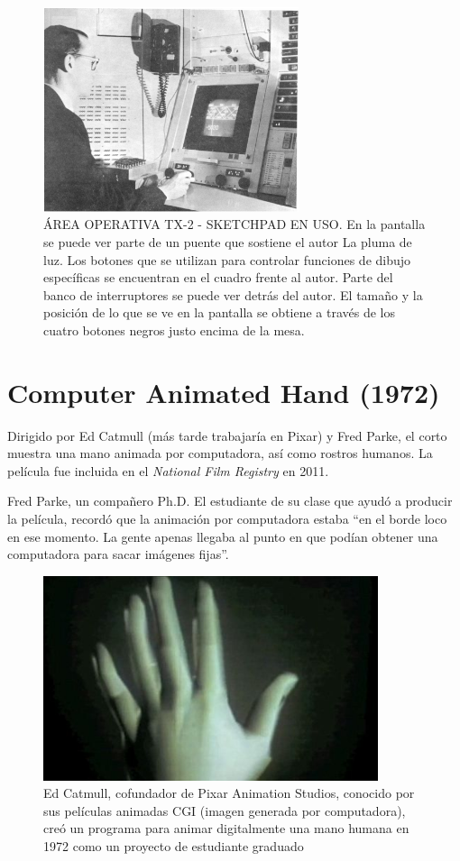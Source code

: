 \documentclass[a4paper,12pt]{report}
\begin{document}
\begin{figure}[ht]
    \centering
    \includegraphics[height=6cm]{Imagenes/sketch}
    \caption{ÁREA OPERATIVA TX-2 - SKETCHPAD EN USO. En la pantalla
    se puede ver parte de un puente que sostiene el autor
    La pluma de luz. Los botones que se utilizan para controlar funciones de dibujo específicas se encuentran en el cuadro frente al autor. Parte del banco de interruptores se puede ver detrás del autor. 
    El tamaño y la posición de lo que se ve en la pantalla se obtiene a través de los cuatro botones negros justo encima de la mesa.}
    \label{fig:sketch_img}
\end{figure}
 
\section{Computer Animated Hand (1972)}
 
 
Dirigido por Ed Catmull (más tarde trabajaría en Pixar) y Fred Parke, el corto muestra una mano animada por computadora, así como rostros humanos.
La película fue incluida en el \textit{National Film Registry} en 2011.
 
Fred Parke, un compañero Ph.D. El estudiante de su clase que ayudó a producir la película, recordó que la animación por computadora estaba ``en el borde loco en ese momento. La gente apenas llegaba 
al punto en que podían obtener una computadora para sacar imágenes fijas''. \cite{animated_hand1}
 
 
\begin{figure}[ht]
    \centering
    \includegraphics[height=6cm]{Imagenes/computer_animated_hand}
    \caption{Ed Catmull, cofundador de Pixar Animation Studios, 
    conocido por sus películas animadas CGI (imagen generada por computadora), 
    creó un programa para animar digitalmente una mano humana en 1972 
    como un proyecto de estudiante graduado}
    \label{fig:computer_animated_hand}
\end{figure}
 
\end{document}

